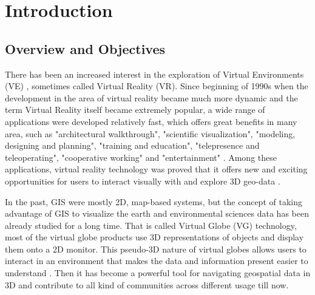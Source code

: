 \label{chapter-introduction}
\chapter{Introduction}

\section{Overview and Objectives}

There has been an increased interest in the exploration of Virtual Environments (VE) \cite{huang.java-cgi-vr.2002}, sometimes called Virtual Reality (VR). Since beginning of 1990s when the development in the area of virtual reality became much more dynamic and the term Virtual Reality itself became extremely popular, a wide range of applications were developed relatively fast, which offers great benefits in many area, such as "architectural walkthrough", "scientific visualization", "modeling, designing and planning", "training and education", "telepresence and teleoperating", "cooperative working" and "entertainment" \cite{mazuryk.vr.1996}. Among these applications, virtual reality technology was proved that it offers new and exciting opportunities for users to interact visually with and explore 3D geo-data \cite{huang.java-cgi-vr.2002}.

In the past, GIS were mostly 2D, map-based systems, but the concept of taking advantage of GIS to visualize the earth and environmental sciences data has been already studied for a long time. That is called Virtual Globe (VG) technology, most of the virtual globe products use 3D representations of objects and display them onto a 2D monitor. This pseudo-3D nature of virtual globes allows users to interact in an environment that makes the data and information present easier to understand \cite{tuttle.virtual-globes.2008}. Then it has become a powerful tool for navigating geospatial data in 3D and contribute to all kind of communities across different usage till now. 

